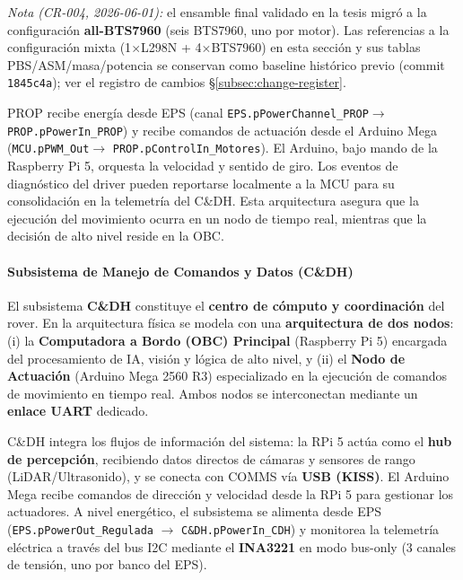 \emph{Nota (CR-004, 2026-06-01):} el ensamble final validado en la tesis migró a la configuración \textbf{all-BTS7960} (seis BTS7960, uno por motor). Las referencias a la configuración mixta (1$\times$L298N + 4$\times$BTS7960) en esta sección y sus tablas PBS/ASM/masa/potencia se conservan como baseline histórico previo (commit \texttt{1845c4a}); ver el registro de cambios \S\ref{subsec:change-register}.

PROP recibe energía desde EPS (canal \texttt{EPS.\allowbreak pPowerChannel\_\allowbreak PROP}\linebreak[0] $\rightarrow$ \texttt{PROP.\allowbreak pPowerIn\_PROP}) y recibe comandos de actuación desde el Arduino Mega (\texttt{MCU.\allowbreak pPWM\_Out}\linebreak[0] $\rightarrow$ \texttt{PROP.\allowbreak pControlIn\_\allowbreak Motores}). El Arduino, bajo mando de la Raspberry Pi 5, orquesta la velocidad y sentido de giro. Los eventos de diagnóstico del driver pueden reportarse localmente a la MCU para su consolidación en la telemetría del C\&DH. Esta arquitectura asegura que la ejecución del movimiento ocurra en un nodo de tiempo real, mientras que la decisión de alto nivel reside en la OBC.

\paragraph{Subsistema de Manejo de Comandos y Datos (C\&DH)}
El subsistema \textbf{C\&DH} constituye el \textbf{centro de cómputo y coordinación} del rover. En la arquitectura física se modela con una \textbf{arquitectura de dos nodos}: (i) la \textbf{Computadora a Bordo (OBC) Principal} (Raspberry Pi 5) encargada del procesamiento de IA, visión y lógica de alto nivel, y (ii) el \textbf{Nodo de Actuación} (Arduino Mega 2560 R3) especializado en la ejecución de comandos de movimiento en tiempo real. Ambos nodos se interconectan mediante un \textbf{enlace UART} dedicado.

C\&DH integra los flujos de información del sistema: la RPi 5 actúa como el \textbf{hub de percepción}, recibiendo datos directos de cámaras y sensores de rango (LiDAR/Ultrasonido), y se conecta con COMMS vía \textbf{USB (KISS)}. El Arduino Mega recibe comandos de dirección y velocidad desde la RPi 5 para gestionar los actuadores. A nivel energético, el subsistema se alimenta desde EPS (\texttt{EPS.pPowerOut\_Regulada} $\rightarrow$ \texttt{C\&DH.pPowerIn\_CDH}) y monitorea la telemetría eléctrica a través del bus I2C mediante el \textbf{INA3221} en modo bus-only (3 canales de tensión, uno por banco del EPS).

